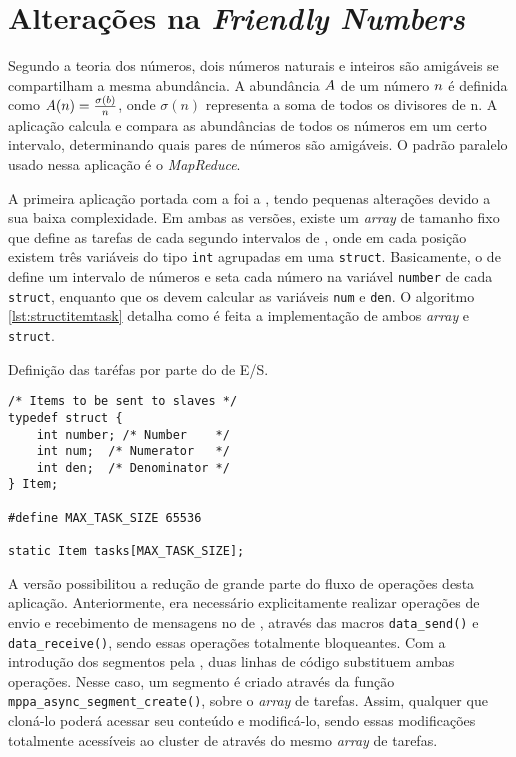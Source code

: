 \section{Alterações na \textit{Friendly Numbers}}
\label{sec:alteracoesfn}

Segundo a teoria dos números, dois números naturais e inteiros são amigáveis se compartilham a mesma abundância. A abundância $\mathnormal{A}$ de um número $\mathnormal{n}$ é definida como $\mathnormal{A(n) = \frac{\sigma(b)}{n}}$, onde $\sigma(n)$ representa a soma de todos os divisores de n. A aplicação \textit{\FN} calcula e compara as abundâncias de todos os números em um certo intervalo, determinando quais pares de números são amigáveis. O padrão paralelo usado nessa aplicação é o \textit{MapReduce}.

A primeira aplicação portada com a \ASYNC foi a \textit{\FN}, tendo pequenas alterações devido a sua baixa complexidade. Em ambas as versões, existe um \textit{array} de tamanho fixo que define as tarefas de cada \cluster segundo intervalos de \offsets, onde em cada posição existem três variáveis do tipo \texttt{int} agrupadas em uma \texttt{struct}. Basicamente, o \cluster de \IO define um intervalo de números e seta cada número na variável \texttt{number} de cada \texttt{struct}, enquanto que os \CCs devem calcular as variáveis \texttt{num} e \texttt{den}. O algoritmo \ref{lst:structitemtask} detalha como é feita a implementação de ambos \textit{array} e \texttt{struct}.

\begin{listing}[h]
\caption{Definição das taréfas por  parte do \cluster de E/S.}
\label{lst:structitemtask}
\begin{verbatim}
/* Items to be sent to slaves */
typedef struct {
    int number; /* Number    */
    int num;  /* Numerator   */
    int den;  /* Denominator */
} Item;    

#define MAX_TASK_SIZE 65536

static Item tasks[MAX_TASK_SIZE];
\end{verbatim}
\end{listing}

A versão \ASYNC possibilitou a redução de grande parte do fluxo de operações desta aplicação. Anteriormente, era necessário explicitamente realizar operações de envio e recebimento de mensagens no \cluster de \IO, através das macros \texttt{data\_send()} e \texttt{data\_receive()}, sendo essas operações totalmente bloqueantes. Com a introdução dos segmentos pela \API \ASYNC, duas linhas de código substituem ambas operações. Nesse caso, um segmento é criado através da função \texttt{mppa\_async\_segment\_create()}, sobre o \textit{array} de tarefas. Assim, qualquer \CC que cloná-lo poderá acessar seu conteúdo e modificá-lo, sendo essas modificações totalmente acessíveis ao cluster de \IO através do mesmo \textit{array} de tarefas.


